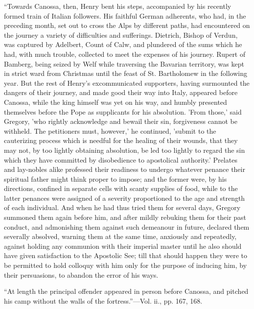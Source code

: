 ``Towards
Canossa, then, Henry bent his steps, accompanied by his recently
formed train of Italian followers. His faithful German adherents, who
had, in the preceding month, set out to cross the Alps by different
paths, had encountered on the journey a variety of difficulties and
sufferings. Dietrich, Bishop of Verdun, was captured by Adelbert,
Count of Calw, and plundered of the sums which he had, with much
trouble, collected to meet the expenses of his journey. Rupert of
Bamberg, being seized by Welf while traversing the Bavarian territory,
was kept in strict ward from Christmas until the feast of St.
Bartholomew in the following year. But the rest of Henry's
excommunicated supporters, having surmounted the dangers of their
journey, and made good their way into Italy, appeared before Canossa,
while the king himself was yet on his way, and humbly presented
themselves before the Pope as supplicants for his absolution. 'From
those,' said Gregory, 'who rightly acknowledge and bewail their sin,
forgiveness cannot be withheld. The petitioners must, however,' he
continued, 'submit to the cauterizing process which is needful for the
healing of their wounds, that they may not, by too lightly obtaining
absolution, be led too lightly to regard the sin which they have
committed by disobedience to apostolical authority.' Prelates and
lay-nobles alike professed their readiness to undergo whatever penance
their spiritual father might think proper to impose; and the former
were, by his directions, confined
in separate cells with scanty supplies of food, while to the latter
penances were assigned of a severity proportioned to the age and
strength of each individual. And when he had thus tried them for
several days, Gregory summoned them again before him, and after mildly
rebuking them for their past conduct, and admonishing them against
such demeanour in future, declared them severally absolved, warning
them at the same time, anxiously and repeatedly, against holding any
communion with their imperial master until he also should have given
satisfaction to the Apostolic See; till that should happen they were
to be permitted to hold colloquy with him only for the purpose of
inducing him, by their persuasions, to abandon the error of his ways.

``At
length the principal offender appeared in person before Canossa, and
pitched his camp without the walls of the fortress.''—Vol. ii., pp.
167, 168.

